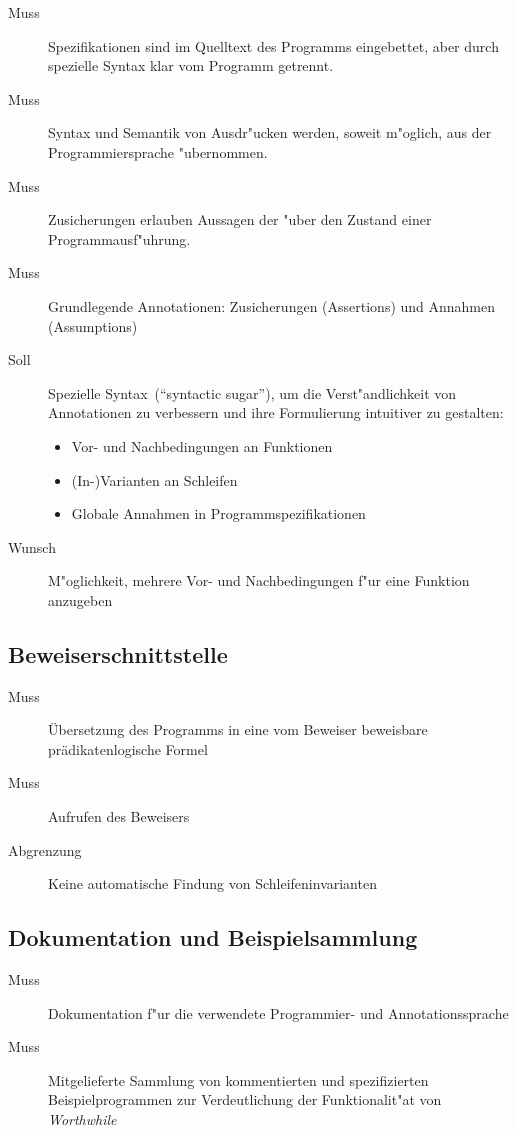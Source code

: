 \begin{description}%
    \item [Muss] Spezifikationen sind im Quelltext des Programms eingebettet, aber durch spezielle Syntax klar vom Programm getrennt.%
    \item [Muss] Syntax und Semantik von Ausdr"ucken werden, soweit m"oglich, aus der Programmiersprache "ubernommen.%
    \item [Muss] Zusicherungen erlauben Aussagen der  "uber den Zustand einer Programmausf"uhrung.%
    \item [Muss] Grundlegende Annotationen: Zusicherungen (Assertions) und Annahmen (Assumptions)%
    \item [Soll] Spezielle Syntax~("`syntactic sugar"'), um die Verst"andlichkeit von Annotationen zu verbessern und ihre Formulierung intuitiver zu gestalten:%
        \begin{itemize}%
            \item Vor- und Nachbedingungen an Funktionen%
            \item (In-)Varianten an Schleifen%
            \item Globale Annahmen in Programmspezifikationen%
        \end{itemize}%
    \item [Wunsch] M"oglichkeit, mehrere Vor- und Nachbedingungen f"ur eine Funktion anzugeben%
\end{description}%

\subsection{Beweiserschnittstelle}%

\begin{description}%
    \item [Muss] Übersetzung des Programms in eine vom Beweiser beweisbare prädikatenlogische Formel
    \item [Muss] Aufrufen des Beweisers
    \item [Abgrenzung] Keine automatische Findung von Schleifeninvarianten
\end{description}%

\subsection{Dokumentation und Beispielsammlung}%

\begin{description}%
    \item [Muss] Dokumentation f"ur die verwendete Programmier- und Annotationssprache%
    \item [Muss] Mitgelieferte Sammlung von kommentierten und spezifizierten Beispielprogrammen zur Verdeutlichung der Funktionalit"at von \textit{Worthwhile}%
\end{description}%

